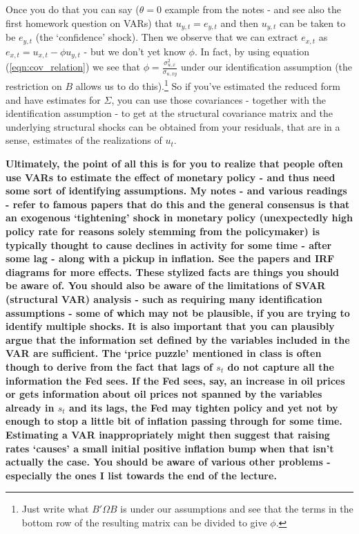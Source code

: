 \documentclass[authoryear,11pt]{elsarticle}
\begin{document}
Once you do that you can say ($\theta = 0$ example from the notes - and see also the first homework question on VARs) that $u_{y,t}=e_{y,t}$ and then $u_{y,t}$ can be taken to be $e_{y,t}$ (the `confidence' shock). Then we observe that we can extract $e_{x,t}$ as $e_{x,t} = u_{x,t} - \phi u_{y,t}$ - but we don't yet know $\phi$. In fact, by using equation (\ref{eqn:cov_relation}) we see that $\phi = \frac{\sigma_{u,x}^{2}}{\sigma_{u,xy}}$ under our identification assumption (the restriction on $B$ allows us to do this).\footnote{Just write what $B'\Omega B$ is under our assumptions and see that the terms in the bottom row of the resulting matrix can be divided to give $\phi$.} So if you've estimated the reduced form and have estimates for $\Sigma$, you can use those covariances - together with the identification assumption - to get at the structural covariance matrix and the underlying structural shocks can be obtained from your residuals, that are in a sense, estimates of the realizations of $u_{t}$.

\textbf{Ultimately, the point of all this is for you to realize that people often use VARs to estimate the effect of monetary policy - and thus need some sort of identifying assumptions. My notes - and various readings - refer to famous papers that do this and the general consensus is that an exogenous `tightening' shock in monetary policy (unexpectedly high policy rate for reasons solely stemming from the policymaker) is typically thought to cause declines in activity for some time - after some lag - along with a pickup in inflation. See the papers and IRF diagrams for more effects. These stylized facts are things you should be aware of. You should also be aware of the limitations of SVAR (structural VAR) analysis - such as requiring many identification assumptions - some of which may not be plausible, if you are trying to identify multiple shocks. It is also important that you can plausibly argue that the information set defined by the variables included in the VAR are sufficient. The `price puzzle' mentioned in class is often though to derive from the fact that lags of $s_{t}$ do not capture all the information the Fed sees. If the Fed sees, say, an increase in oil prices or gets information about oil prices not spanned by the variables already in $s_{t}$ and its lags, the Fed may tighten policy and yet not by enough to stop a little bit of inflation passing through for some time. Estimating a VAR inappropriately might then suggest that raising rates `causes' a small initial positive inflation bump when that isn't actually the case. You should be aware of various other problems - especially the ones I list towards the end of the lecture.}
\end{document}
